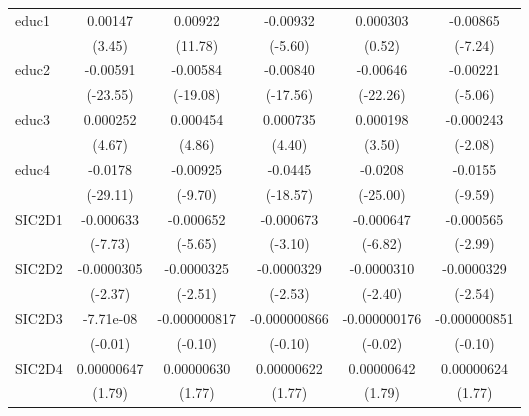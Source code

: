\begin{table}[htbp]
\begin{tabular}{l*{5}{c}}
educ1       &     0.00147\sym{***}&     0.00922\sym{***}&    -0.00932\sym{***}&    0.000303         &    -0.00865\sym{***}\\
            &      (3.45)         &     (11.78)         &     (-5.60)         &      (0.52)         &     (-7.24)         \\
educ2       &    -0.00591\sym{***}&    -0.00584\sym{***}&    -0.00840\sym{***}&    -0.00646\sym{***}&    -0.00221\sym{***}\\
            &    (-23.55)         &    (-19.08)         &    (-17.56)         &    (-22.26)         &     (-5.06)         \\
educ3       &    0.000252\sym{***}&    0.000454\sym{***}&    0.000735\sym{***}&    0.000198\sym{***}&   -0.000243\sym{*}  \\
            &      (4.67)         &      (4.86)         &      (4.40)         &      (3.50)         &     (-2.08)         \\
educ4       &     -0.0178\sym{***}&    -0.00925\sym{***}&     -0.0445\sym{***}&     -0.0208\sym{***}&     -0.0155\sym{***}\\
            &    (-29.11)         &     (-9.70)         &    (-18.57)         &    (-25.00)         &     (-9.59)         \\
SIC2D1      &   -0.000633\sym{***}&   -0.000652\sym{***}&   -0.000673\sym{**} &   -0.000647\sym{***}&   -0.000565\sym{**} \\
            &     (-7.73)         &     (-5.65)         &     (-3.10)         &     (-6.82)         &     (-2.99)         \\
SIC2D2      &  -0.0000305\sym{*}  &  -0.0000325\sym{*}  &  -0.0000329\sym{*}  &  -0.0000310\sym{*}  &  -0.0000329\sym{*}  \\
            &     (-2.37)         &     (-2.51)         &     (-2.53)         &     (-2.40)         &     (-2.54)         \\
SIC2D3      &   -7.71e-08         &-0.000000817         &-0.000000866         &-0.000000176         &-0.000000851         \\
            &     (-0.01)         &     (-0.10)         &     (-0.10)         &     (-0.02)         &     (-0.10)         \\
SIC2D4      &  0.00000647         &  0.00000630         &  0.00000622         &  0.00000642         &  0.00000624         \\
            &      (1.79)         &      (1.77)         &      (1.77)         &      (1.79)         &      (1.77)         \\

\end{tabular}
\end{table}
